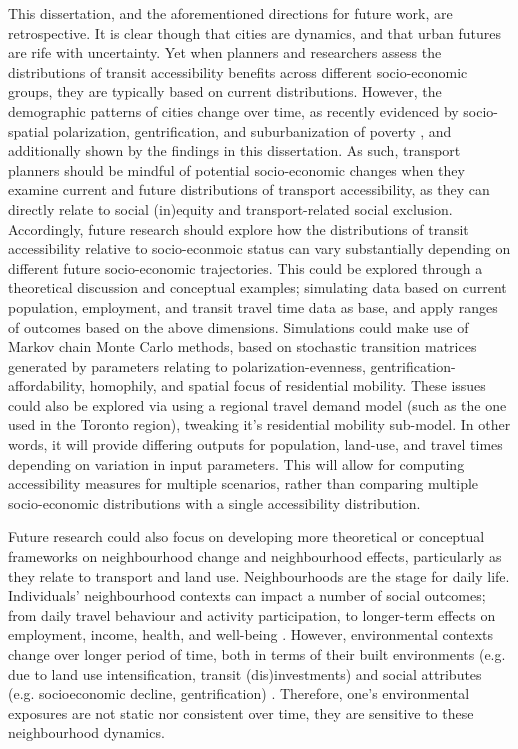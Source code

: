 This dissertation, and the aforementioned directions for future work, are retrospective. It is clear though that cities are dynamics, and that urban futures are rife with uncertainty. Yet when planners and researchers assess the distributions of transit accessibility benefits across different socio-economic groups, they are typically based on current distributions. However, the demographic patterns of cities change over time, as recently evidenced by socio-spatial polarization, gentrification, and suburbanization of poverty \cite{ades_are_2012,van_ham_understanding_2013,grant_changing_2020}, and additionally shown by the findings in this dissertation. As such, transport planners should be mindful of potential socio-economic changes when they examine current and future distributions of transport accessibility, as they can directly relate to social (in)equity and transport-related social exclusion. Accordingly, future research should explore how the distributions of transit accessibility relative to socio-econmoic status can vary substantially depending on different future socio-economic trajectories. This could be explored through a theoretical discussion and conceptual examples; simulating data based on current population, employment, and transit travel time data as base, and apply ranges of outcomes based on the above dimensions. Simulations could make use of Markov chain Monte Carlo methods, based on stochastic transition matrices generated by parameters relating to polarization-evenness, gentrification-affordability, homophily, and spatial focus of residential mobility. These issues could also be explored via using a regional travel demand model (such as the one used in the Toronto region), tweaking it's residential mobility sub-model.  In other words, it will provide differing outputs for population, land-use, and travel times depending on variation in input parameters. This will allow for computing accessibility measures for multiple scenarios, rather than comparing multiple socio-economic distributions with a single accessibility distribution. 

Future research could also focus on developing more theoretical or conceptual frameworks on neighbourhood change and neighbourhood effects, particularly as they relate to transport and land use. Neighbourhoods are the stage for daily life. Individuals' neighbourhood contexts can impact a number of social outcomes; from daily travel behaviour and activity participation, to longer-term effects on employment, income, health, and well-being \cite{sampson_assessing_2002,ewing_travel_2010,lucas_transport_2012,bastiaanssen_does_2020}. However, environmental contexts change over longer period of time, both in terms of their built environments (e.g. due to land use intensification, transit (dis)investments) and social attributes (e.g. socioeconomic decline, gentrification) \cite{van_ham_understanding_2013,wegener_land-use_2004}. Therefore, one's environmental exposures are not static nor consistent over time, they are sensitive to these neighbourhood dynamics. 

